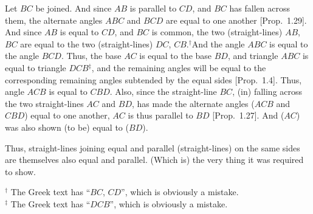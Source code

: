 \begin{Parallel}{}{}
{\epsfysize=1.7in
\centerline{}

Let $BC$ be joined. And since $AB$ is parallel to $CD$, and $BC$ has
fallen across them, the alternate angles $ABC$ and $BCD$ are equal to one another [Prop.~1.29]. And since $AB$ is equal to $CD$, and $BC$ is common,
the two (straight-lines) $AB$, $BC$ are equal to the two (straight-lines)
$DC$, $CB$.$^\dag$And the angle $ABC$ is equal to the angle $BCD$. Thus, the
base $AC$ is equal to the base $BD$, and triangle $ABC$ is equal to triangle
$DCB$$^\ddag$, and the remaining angles will be equal to the corresponding remaining
angles subtended by the equal sides [Prop.~1.4]. Thus,  angle $ACB$ 
is equal to $CBD$. Also, since the straight-line $BC$, (in) falling across the two
straight-lines $AC$ and $BD$, has made the alternate angles  ($ACB$ and $CBD$) equal to one another,
$AC$ is thus parallel to $BD$ [Prop.~1.27]. And ($AC$) was also shown (to be) equal
to ($BD$).

Thus, straight-lines joining equal and parallel (straight-lines) on the same sides
are  themselves also equal and parallel. (Which is) the very thing it was
required to show.}
\end{Parallel}
{\footnotesize \noindent$^\dag$ The Greek text has ``$BC$, $CD$'', which is obviously a mistake.} \\
{\footnotesize \noindent$^\ddag$ The Greek text has ``$DCB$'', which is obviously a mistake.} 

